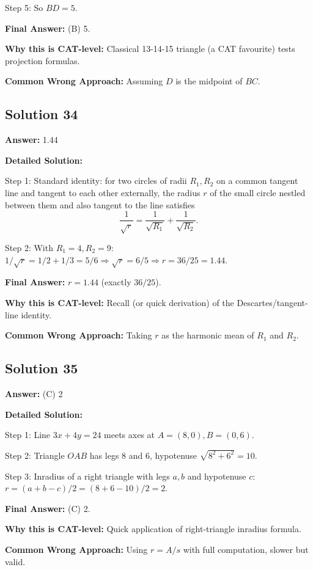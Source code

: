 \documentclass[11pt]{article}
\begin{document}
Step 5: So $BD = 5$.

\textbf{Final Answer:} (B) 5.

\textbf{Why this is CAT-level:} Classical 13-14-15 triangle (a CAT favourite) tests projection formulas.

\textbf{Common Wrong Approach:} Assuming $D$ is the midpoint of $BC$.

\subsection*{Solution 34}
\textbf{Answer:} 1.44

\textbf{Detailed Solution:}

Step 1: Standard identity: for two circles of radii $R_1, R_2$ on a common tangent line and tangent to each other externally, the radius $r$ of the small circle nestled between them and also tangent to the line satisfies
\[ \frac{1}{\sqrt{r}} = \frac{1}{\sqrt{R_1}} + \frac{1}{\sqrt{R_2}}. \]

Step 2: With $R_1 = 4, R_2 = 9$: $1/\sqrt{r} = 1/2 + 1/3 = 5/6 \Rightarrow \sqrt{r} = 6/5 \Rightarrow r = 36/25 = 1.44$.

\textbf{Final Answer:} $r = 1.44$ (exactly $36/25$).

\textbf{Why this is CAT-level:} Recall (or quick derivation) of the Descartes/tangent-line identity.

\textbf{Common Wrong Approach:} Taking $r$ as the harmonic mean of $R_1$ and $R_2$.

\subsection*{Solution 35}
\textbf{Answer:} (C) 2

\textbf{Detailed Solution:}

Step 1: Line $3x + 4y = 24$ meets axes at $A = (8, 0), B = (0, 6)$.

Step 2: Triangle $OAB$ has legs $8$ and $6$, hypotenuse $\sqrt{8^2 + 6^2} = 10$.

Step 3: Inradius of a right triangle with legs $a, b$ and hypotenuse $c$: $r = (a + b - c)/2 = (8 + 6 - 10)/2 = 2$.

\textbf{Final Answer:} (C) 2.

\textbf{Why this is CAT-level:} Quick application of right-triangle inradius formula.

\textbf{Common Wrong Approach:} Using $r = A/s$ with full computation, slower but valid.
\end{document}
